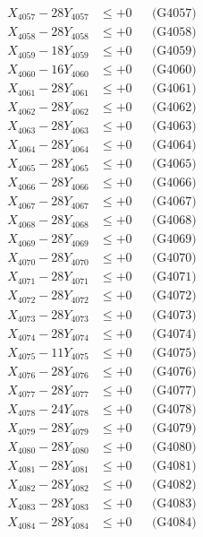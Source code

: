 \documentclass[a4paper,10pt]{article}
\begin{document}
{\begin{align}
X_{4057} - 28Y_{4057} &\leq +0 && \text{(G4057)} \\
X_{4058} - 28Y_{4058} &\leq +0 && \text{(G4058)} \\
X_{4059} - 18Y_{4059} &\leq +0 && \text{(G4059)} \\
X_{4060} - 16Y_{4060} &\leq +0 && \text{(G4060)} \\
\allowbreak
X_{4061} - 28Y_{4061} &\leq +0 && \text{(G4061)} \\
X_{4062} - 28Y_{4062} &\leq +0 && \text{(G4062)} \\
X_{4063} - 28Y_{4063} &\leq +0 && \text{(G4063)} \\
X_{4064} - 28Y_{4064} &\leq +0 && \text{(G4064)} \\
X_{4065} - 28Y_{4065} &\leq +0 && \text{(G4065)} \\
X_{4066} - 28Y_{4066} &\leq +0 && \text{(G4066)} \\
X_{4067} - 28Y_{4067} &\leq +0 && \text{(G4067)} \\
X_{4068} - 28Y_{4068} &\leq +0 && \text{(G4068)} \\
X_{4069} - 28Y_{4069} &\leq +0 && \text{(G4069)} \\
X_{4070} - 28Y_{4070} &\leq +0 && \text{(G4070)} \\
\allowbreak
X_{4071} - 28Y_{4071} &\leq +0 && \text{(G4071)} \\
X_{4072} - 28Y_{4072} &\leq +0 && \text{(G4072)} \\
X_{4073} - 28Y_{4073} &\leq +0 && \text{(G4073)} \\
X_{4074} - 28Y_{4074} &\leq +0 && \text{(G4074)} \\
X_{4075} - 11Y_{4075} &\leq +0 && \text{(G4075)} \\
X_{4076} - 28Y_{4076} &\leq +0 && \text{(G4076)} \\
X_{4077} - 28Y_{4077} &\leq +0 && \text{(G4077)} \\
X_{4078} - 24Y_{4078} &\leq +0 && \text{(G4078)} \\
X_{4079} - 28Y_{4079} &\leq +0 && \text{(G4079)} \\
X_{4080} - 28Y_{4080} &\leq +0 && \text{(G4080)} \\
\allowbreak
X_{4081} - 28Y_{4081} &\leq +0 && \text{(G4081)} \\
X_{4082} - 28Y_{4082} &\leq +0 && \text{(G4082)} \\
X_{4083} - 28Y_{4083} &\leq +0 && \text{(G4083)} \\
X_{4084} - 28Y_{4084} &\leq +0 && \text{(G4084)} \\

\end{align}}
\end{document}
